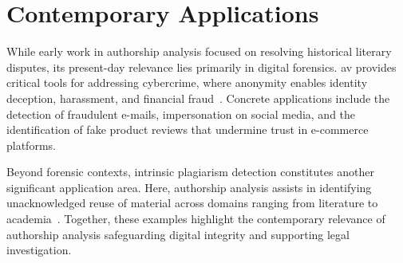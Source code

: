 \section{Contemporary Applications} %

While early work in authorship analysis focused on resolving historical literary disputes, its present-day relevance lies primarily in digital forensics. %
\ac{av} provides critical tools for addressing cybercrime, where anonymity enables identity deception, harassment, and financial fraud~\citep{abbasi_writeprints_2008,uchendu_authorship_2020,bhattacharjee_fighting_2024}. 
Concrete applications include the detection of fraudulent e-mails, impersonation on social media, and the identification of fake product reviews that undermine trust in e-commerce platforms. 

Beyond forensic contexts, intrinsic plagiarism detection constitutes another significant application area. 
Here, authorship analysis assists in identifying unacknowledged reuse of material across domains ranging from literature to academia~\citep{neal_surveying_2018}. 
Together, these examples highlight the contemporary relevance of authorship analysis safeguarding digital integrity and supporting legal investigation.
